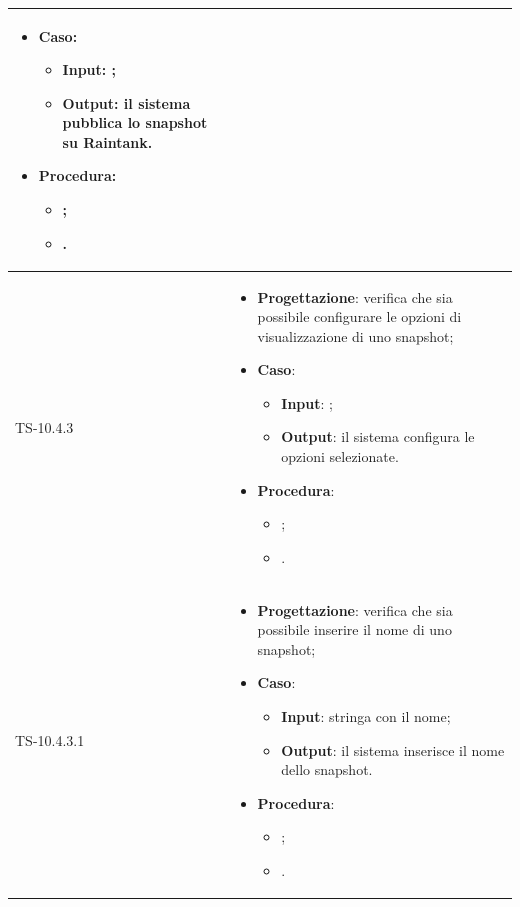 \begin{longtable}{|C{2.5cm}|C{13cm}|}
\begin{itemize}
	\item \textbf{Caso}: 
	\begin{itemize}
		\item \textbf{Input}: ;
		\item \textbf{Output}: il sistema pubblica lo snapshot su Raintank.
	\end{itemize}
	\item \textbf{Procedura}:
	\begin{itemize}
		\item ;
		\item .
	\end{itemize} 
\end{itemize}
	 \\
	\hline
	{TS-10.4.3} & 
\begin{itemize}
	\item \textbf{Progettazione}: verifica che sia possibile configurare le
	opzioni di visualizzazione di uno snapshot;
	\item \textbf{Caso}: 
	\begin{itemize}
		\item \textbf{Input}: ;
		\item \textbf{Output}: il sistema configura le opzioni selezionate.
	\end{itemize}
	\item \textbf{Procedura}:
	\begin{itemize}
		\item ;
		\item .
	\end{itemize} 
\end{itemize}
	\\
	\hline
	{TS-10.4.3.1} &
\begin{itemize}
	\item \textbf{Progettazione}: verifica che sia possibile inserire il nome
	di uno snapshot;
	\item \textbf{Caso}: 
	\begin{itemize}
		\item \textbf{Input}: stringa con il nome;
		\item \textbf{Output}: il sistema inserisce il nome dello snapshot.
	\end{itemize}
	\item \textbf{Procedura}:
	\begin{itemize}
		\item ;
		\item .
	\end{itemize} 
\end{itemize}

\end{longtable}
